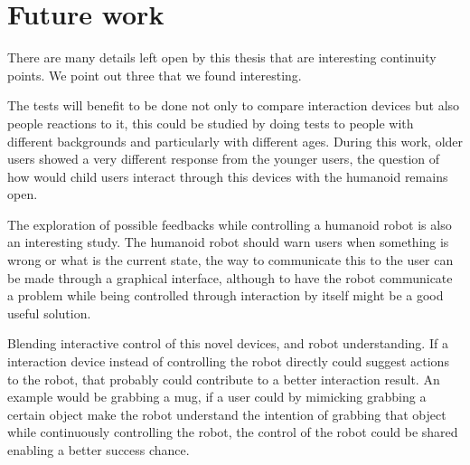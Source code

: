 \section{Future work}

	There are many details left open by this thesis that are interesting continuity points. We point out three that we found interesting.
	
	The tests will benefit to be done not only to compare interaction devices but also people reactions to it, this could be studied by doing tests to people with different backgrounds and particularly with different ages. During this work, older users showed a very different response from the younger users, the question of how would child users interact through this devices with the humanoid remains open.
	
	The exploration of possible feedbacks while controlling a humanoid robot is also an interesting study. The humanoid robot should warn users when something is wrong or what is the current state, the way to communicate this to the user can be made through a graphical interface, although to have the robot communicate a problem while being controlled through interaction by itself might be a good useful solution.
	
	Blending interactive control of this novel devices, and robot understanding. If a interaction device instead of controlling the robot directly could suggest actions to the robot, that probably could contribute to a better interaction result. An example would be grabbing a mug, if a user could by mimicking grabbing a certain object make the robot understand the intention of grabbing that object while continuously controlling the robot, the control of the robot could be shared enabling a better success chance.
	